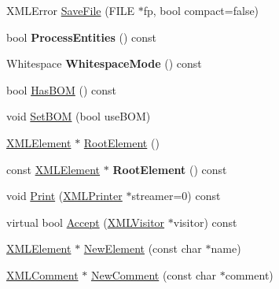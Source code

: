 \begin{DoxyCompactItemize}
\item 
X\+M\+L\+Error \hyperlink{classCPlantBox_1_1tinyxml2_1_1XMLDocument_a5bc85793a09dc7b2c4c7c66df469ed8c}{Save\+File} (F\+I\+LE $\ast$fp, bool compact=false)
\item 
\mbox{\label{classCPlantBox_1_1tinyxml2_1_1XMLDocument_aeee1e4012fd9438a6d47af90d36690c6}} 
bool {\bfseries Process\+Entities} () const
\item 
\mbox{\label{classCPlantBox_1_1tinyxml2_1_1XMLDocument_a31ea4d054142c57317438f1491a60c2b}} 
Whitespace {\bfseries Whitespace\+Mode} () const
\item 
bool \hyperlink{classCPlantBox_1_1tinyxml2_1_1XMLDocument_ad92261e0a002bf0cdf5126a6ef60d3ff}{Has\+B\+OM} () const
\item 
void \hyperlink{classCPlantBox_1_1tinyxml2_1_1XMLDocument_ac906b99f5fc6405204391316c0c0f709}{Set\+B\+OM} (bool use\+B\+OM)
\item 
\hyperlink{classCPlantBox_1_1tinyxml2_1_1XMLElement}{X\+M\+L\+Element} $\ast$ \hyperlink{classCPlantBox_1_1tinyxml2_1_1XMLDocument_af2c2522e70ac7a16d3df80847035cf17}{Root\+Element} ()
\item 
\mbox{\label{classCPlantBox_1_1tinyxml2_1_1XMLDocument_a8066beea5d395fb9bacb975daec0f0ab}} 
const \hyperlink{classCPlantBox_1_1tinyxml2_1_1XMLElement}{X\+M\+L\+Element} $\ast$ {\bfseries Root\+Element} () const
\item 
void \hyperlink{classCPlantBox_1_1tinyxml2_1_1XMLDocument_a306348e6959e42c2e1a995959b7d0847}{Print} (\hyperlink{classCPlantBox_1_1tinyxml2_1_1XMLPrinter}{X\+M\+L\+Printer} $\ast$streamer=0) const
\item 
virtual bool \hyperlink{classCPlantBox_1_1tinyxml2_1_1XMLDocument_acca54ff6fe186645813bc5ce00326653}{Accept} (\hyperlink{classCPlantBox_1_1tinyxml2_1_1XMLVisitor}{X\+M\+L\+Visitor} $\ast$visitor) const
\item 
\hyperlink{classCPlantBox_1_1tinyxml2_1_1XMLElement}{X\+M\+L\+Element} $\ast$ \hyperlink{classCPlantBox_1_1tinyxml2_1_1XMLDocument_a6deb964be32cf8fb1561af04dc572f97}{New\+Element} (const char $\ast$name)
\item 
\hyperlink{classCPlantBox_1_1tinyxml2_1_1XMLComment}{X\+M\+L\+Comment} $\ast$ \hyperlink{classCPlantBox_1_1tinyxml2_1_1XMLDocument_a95bf156380454e620d1dc5f2b729dbc8}{New\+Comment} (const char $\ast$comment)

\end{DoxyCompactItemize}
